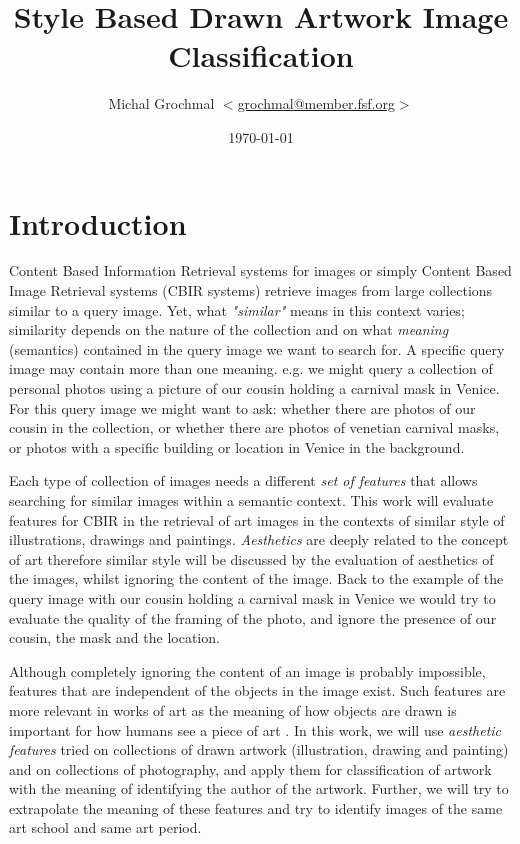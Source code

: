 \documentclass[a4paper,twocolumn]{article}
\title{Style Based Drawn Artwork Image Classification}
\author{Michal Grochmal
  $<$\href{mailto:grochmal@member.fsf.org}{grochmal@member.fsf.org}$>$
}
\date{\today}
\begin{document}
\maketitle

\section{Introduction}

Content Based Information Retrieval systems for images or simply Content Based
Image Retrieval systems (CBIR systems) retrieve images from large collections
similar to a query image.  Yet, what \emph{"similar"} means in this context
varies;  similarity depends on the nature of the collection and on what
\emph{meaning} (semantics) contained in the query image we want to search for.
A specific query image may contain more than one meaning.  e.g. we might query
a collection of personal photos using a picture of our cousin holding a
carnival mask in Venice.  For this query image we might want to ask: whether
there are photos of our cousin in the collection, or whether there are photos
of venetian carnival masks, or photos with a specific building or location in
Venice in the background.

Each type of collection of images needs a different \emph{set of features} that
allows searching for similar images within a semantic context.  This work will
evaluate features for CBIR in the retrieval of art images in the contexts of
similar style of illustrations, drawings and paintings.  \emph{Aesthetics} are
deeply related to the concept of art \cite{rmc12ajs} therefore similar style
will be discussed by the evaluation of aesthetics of the images, whilst
ignoring the content of the image.  Back to the example of the query image with
our cousin holding a carnival mask in Venice we would try to evaluate the
quality of the framing of the photo, and ignore the presence of our cousin, the
mask and the location.

Although completely ignoring the content of an image is probably impossible,
features that are independent of the objects in the image exist.  Such features
are more relevant in works of art \cite{zirnhelt07art} as the meaning of how
objects are drawn is important for how humans see a piece of art
\cite{mach10clas}.  In this work, we will use \emph{aesthetic features} tried
on collections of drawn artwork (illustration, drawing and painting) and on
collections of photography, and apply them for classification of artwork with
the meaning of identifying the author of the artwork.  Further, we will try to
extrapolate the meaning of these features and try to identify images of the
same art school and same art period.
\end{document}
